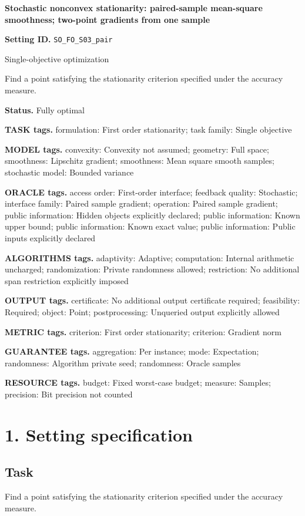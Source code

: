 \documentclass[10pt,a4paper]{article}
\begin{document}
\raggedright

{\LARGE\bfseries\sffamily\color{AtlasNavy} Stochastic nonconvex stationarity: paired-sample mean-square smoothness; two-point gradients from one sample\par}\vspace{5pt}
\textbf{Setting ID.} \texttt{SO\_\allowbreak{}FO\_\allowbreak{}S03\_\allowbreak{}pair}

Single-objective optimization

Find a point satisfying the stationarity criterion specified under the accuracy measure.

\textbf{Status.} Fully optimal

\textbf{TASK tags.} formulation: First order stationarity; task family: Single objective

\textbf{MODEL tags.} convexity: Convexity not assumed; geometry: Full space; smoothness: Lipschitz gradient; smoothness: Mean square smooth samples; stochastic model: Bounded variance

\textbf{ORACLE tags.} access order: First-order interface; feedback quality: Stochastic; interface family: Paired sample gradient; operation: Paired sample gradient; public information: Hidden objects explicitly declared; public information: Known upper bound; public information: Known exact value; public information: Public inputs explicitly declared

\textbf{ALGORITHMS tags.} adaptivity: Adaptive; computation: Internal arithmetic uncharged; randomization: Private randomness allowed; restriction: No additional span restriction explicitly imposed

\textbf{OUTPUT tags.} certificate: No additional output certificate required; feasibility: Required; object: Point; postprocessing: Unqueried output explicitly allowed

\textbf{METRIC tags.} criterion: First order stationarity; criterion: Gradient norm

\textbf{GUARANTEE tags.} aggregation: Per instance; mode: Expectation; randomness: Algorithm private seed; randomness: Oracle samples

\textbf{RESOURCE tags.} budget: Fixed worst-case budget; measure: Samples; precision: Bit precision not counted

\section{1. Setting specification}
\subsection{Task}
Find a point satisfying the stationarity criterion specified under the accuracy measure.
\end{document}
